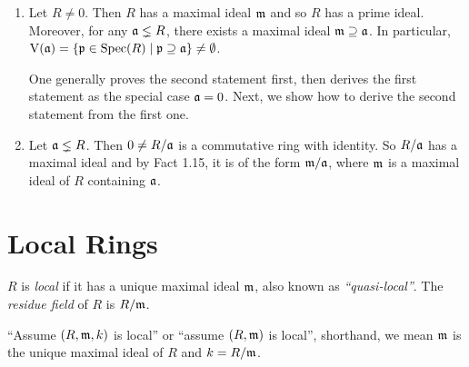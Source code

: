 \begin{fact}
    \begin{enumerate}
        \item 
            Let $R \neq 0$. Then $R$ has a maximal ideal $\mathfrak{m}$ and so $R$ has a prime ideal. Moreover, for any $\mathfrak{a} \lneq R$, there exists a maximal ideal $\mathfrak{m} \supseteq \mathfrak{a}$. In particular, $\operatorname{V}(\mathfrak{a}) = \{\mathfrak{p} \in \operatorname{Spec}(R) \mid \mathfrak{p} \supseteq \mathfrak{a}\} \neq \emptyset$. \par
            One generally proves the second statement first, then derives the first statement as the special case $\mathfrak{a} = 0$. Next, we show how to derive the second statement from the first one.
        \item 
            Let $\mathfrak{a} \lneq R$. Then $0 \neq R/\mathfrak{a}$ is a commutative ring with identity. So $R/\mathfrak{a}$ has a maximal ideal and by Fact 1.15, it is of the form $\mathfrak{m}/\mathfrak{a}$, where $\mathfrak{m}$ is a maximal ideal of $R$ containing $\mathfrak{a}$.
    \end{enumerate}
\end{fact}

\section*{Local Rings}

\begin{definition}
    $R$ is \emph{local} if it has a unique maximal ideal $\mathfrak{m}$, also known as \emph{``quasi-local''}. The \emph{residue field} of $R$ is $R/\mathfrak{m}$. \par
    ``Assume $(R,\mathfrak{m},k)$ is local'' or ``assume $(R,\mathfrak{m})$ is local'', shorthand, we mean $\mathfrak{m}$ is the unique maximal ideal of $R$ and $k = R/\mathfrak{m}$. 
\end{definition}

